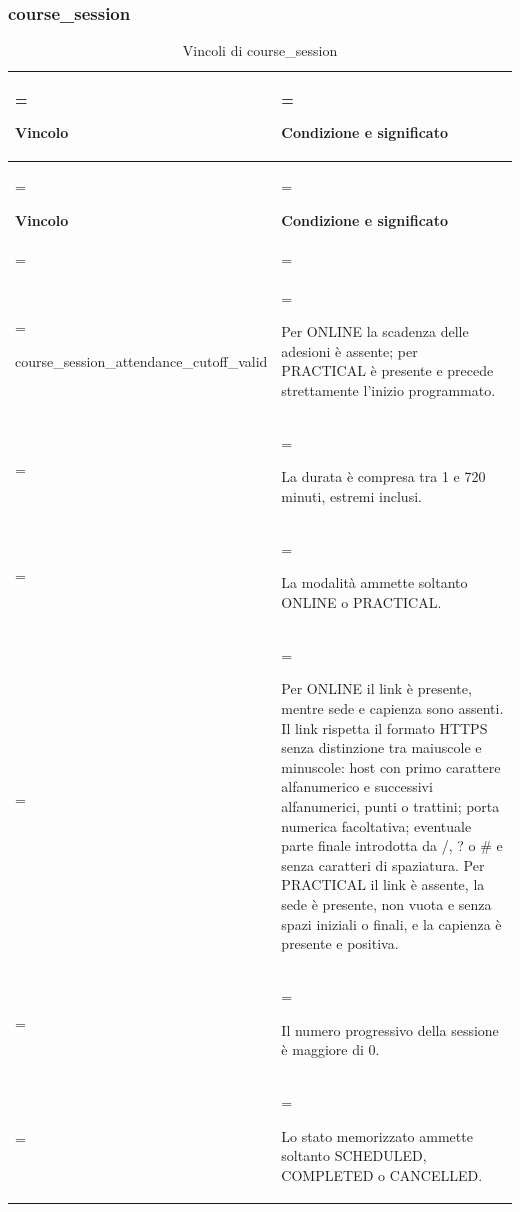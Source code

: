 \documentclass[11pt,a4paper]{article}
\begin{document}
\subsubsection{course\_session}
{\small\renewcommand{\arraystretch}{1.25}
\begin{xltabular}{\linewidth}{>{\hsize\linewidth=\hsize\raggedright\arraybackslash}X>{\hsize\linewidth=\hsize\raggedright\arraybackslash}X}
\caption{Vincoli di course\_session}\label{tab:dictionary-34}\\
\toprule
\textbf{Vincolo} & \textbf{Condizione e significato}\\\midrule\endfirsthead\toprule\textbf{Vincolo} & \textbf{Condizione e significato}\\\midrule\endhead
\midrule{}\\\endfoot\bottomrule\endlastfoot

{\ttfamily\small course\_\allowbreak{}session\_\allowbreak{}attendance\_\allowbreak{}cutoff\_\allowbreak{}valid} & Per ONLINE la scadenza delle adesioni è assente; per PRACTICAL è presente e precede strettamente l'inizio programmato.\\ & La durata è compresa tra 1 e 720 minuti, estremi inclusi.\\ & La modalità ammette soltanto ONLINE o PRACTICAL.\\ & Per ONLINE il link è presente, mentre sede e capienza sono assenti. Il link rispetta il formato HTTPS senza distinzione tra maiuscole e minuscole: host con primo carattere alfanumerico e successivi alfanumerici, punti o trattini; porta numerica facoltativa; eventuale parte finale introdotta da /, ? o \# e senza caratteri di spaziatura. Per PRACTICAL il link è assente, la sede è presente, non vuota e senza spazi iniziali o finali, e la capienza è presente e positiva.\\ & Il numero progressivo della sessione è maggiore di 0.\\ & Lo stato memorizzato ammette soltanto SCHEDULED, COMPLETED o CANCELLED.\\*
\end{xltabular}}
\end{document}
